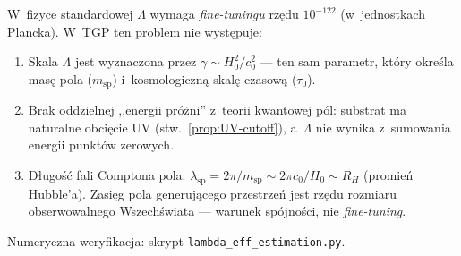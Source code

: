 \begin{remark}%
\label{rem:CC-problem}
W~fizyce standardowej $\Lambda$ wymaga \emph{fine-tuningu}
rz\k{e}du $10^{-122}$ (w~jednostkach Plancka).
W~TGP ten problem nie wyst\k{e}puje:
\begin{enumerate}[nosep]
  \item Skala $\Lambda$ jest wyznaczona przez
    $\gamma \sim H_0^2/c_0^2$ --- ten sam parametr,
    kt\'ory okre\'sla mas\k{e} pola ($m_{\mathrm{sp}}$)
    i~kosmologiczn\k{a} skal\k{e} czasow\k{a} ($\tau_0$).
  \item Brak oddzielnej ,,energii pr\'o\.zni'' z~teorii kwantowej p\'ol:
    substrat ma naturalne obci\k{e}cie UV
    (stw.~\ref{prop:UV-cutoff}), a~$\Lambda$ nie wynika
    z~sumowania energii punkt\'ow zerowych.
  \item D\l{}ugo\'s\'c fali Comptona pola: $\lambda_{\mathrm{sp}}
    = 2\pi/m_{\mathrm{sp}} \sim 2\pi c_0/H_0
    \sim R_H$ (promie\'n Hubble'a).
    Zasi\k{e}g pola generuj\k{a}cego przestrze\'n
    jest rz\k{e}du rozmiaru obserwowalnego Wszech\'swiata
    --- warunek sp\'ojno\'sci, nie \emph{fine-tuning}.
\end{enumerate}
Numeryczna weryfikacja: skrypt \texttt{lambda\_eff\_estimation.py}.
\end{remark}

